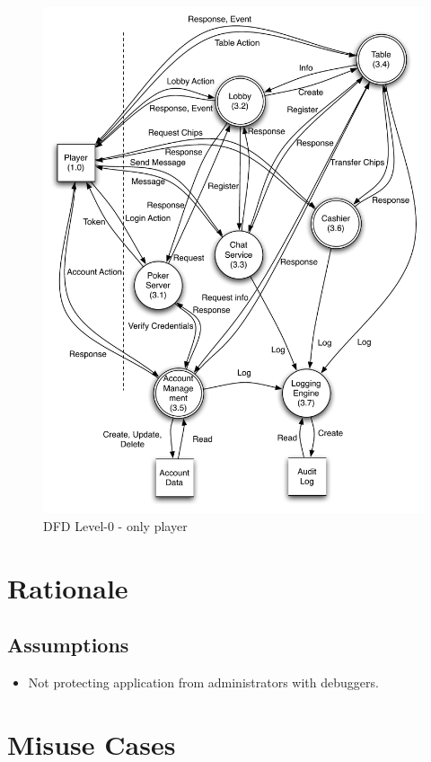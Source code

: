 \documentclass[a4paper,11pt]{report}
\begin{document}
\begin{figure}
  \begin{center}
    \includegraphics[scale=0.7]{dfd_level_0_player}
  \end{center}
  \caption{DFD Level-0 - only player}\label{fig:level_0_player}
\end{figure}

\section{Rationale}
\subsection{Assumptions}
\begin{itemize}
\item Not protecting application from administrators with debuggers.
\end{itemize}

\section{Misuse Cases}
\end{document}
